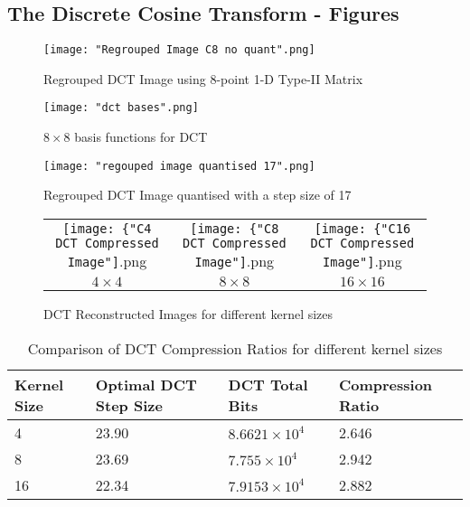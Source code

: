 \documentclass{article}					%
\begin{document}
\begin{appendices}
\section{The Discrete Cosine Transform - Figures}

\begin{figure}[h!]
\begin{centering}
\begin{minipage}{.33\textwidth}
  \centering
  \texttt{[image: "Regrouped Image C8 no quant".png]}
  \caption{Regrouped DCT Image using 8-point 1-D Type-II Matrix}
\end{minipage}
\begin{minipage}{.33\textwidth}
  \centering
  \texttt{[image: "dct bases".png]}
  \caption{$8\times 8$ basis functions for DCT}
\end{minipage}
\begin{minipage}{.33\textwidth}
  \centering
  \texttt{[image: "regouped image quantised 17".png]}
  \caption{Regrouped DCT Image quantised with a step size of 17}
\end{minipage}
\end{centering}
\end{figure}

\begin{figure}[h!]
\begin{centering}
\begin{tabular}{c c c}
  \texttt{[image: \{"C4 DCT Compressed Image"]}.png} & \texttt{[image: \{"C8 DCT Compressed Image"]}.png} & \texttt{[image: \{"C16 DCT Compressed Image"]}.png}\\
  $4\times 4$ & $8\times 8$ & $16\times 16$\\
\end{tabular}
\caption{DCT Reconstructed Images for different kernel sizes}
\end{centering}
\end{figure}

\begin{table}[h!]
\begin{centering}
\begin{tabular}{|l|l|l|l|}
\hline
\textbf{Kernel Size} & \textbf{Optimal DCT Step Size} & \textbf{DCT Total Bits} & \textbf{Compression Ratio} \\ \hline
4                    & 23.90                          & $8.6621\times 10^4$     & 2.646                      \\ \hline
8                    & 23.69                          & $7.755\times 10^4$      & 2.942                      \\ \hline
16                   & 22.34                          & $7.9153\times 10^4$     & 2.882                      \\ \hline
\end{tabular}
\caption{Comparison of DCT Compression Ratios for different kernel sizes}
\end{centering}
\end{table}


\end{appendices}
\end{document}
